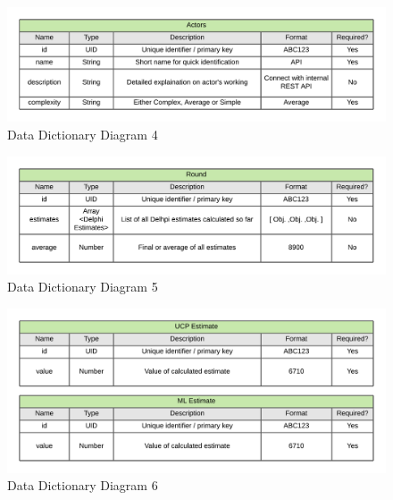 \begin{figure}[H]
    \centering
    \includegraphics[scale=0.7]{./diagrams/data-dictionary/dd-4.png}
    \caption{Data Dictionary Diagram 4}
    \label{fig:dd-diag-4}

\end{figure}


\begin{figure}[H]
    \centering
    \includegraphics[scale=0.7]{./diagrams/data-dictionary/dd-5.png}
    \caption{Data Dictionary Diagram 5}
    \label{fig:dd-diag-5}

\end{figure}



\begin{figure}[H]
    \centering
    \includegraphics[scale=0.7]{./diagrams/data-dictionary/dd-6.png}
    \caption{Data Dictionary Diagram 6}
    \label{fig:dd-diag-6}
\end{figure}